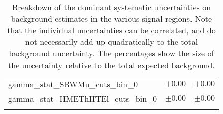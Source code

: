 \begin{table}
\begin{center}
\begin{tabular*}{\textwidth}{@{\extracolsep{\fill}}lcc}
gamma\_stat\_SRWMu\_cuts\_bin\_0         & $\pm 0.00$          & $\pm 0.00$       \\
gamma\_stat\_HMEThHTEl\_cuts\_bin\_0         & $\pm 0.00$          & $\pm 0.00$       \\
\noalign{\smallskip}\hline\noalign{\smallskip}
\end{tabular*}
\end{center}
\caption[Breakdown of uncertainty on background estimates]{
Breakdown of the dominant systematic uncertainties on background estimates in the various signal regions.
Note that the individual uncertainties can be correlated, and do not necessarily add up quadratically to 
the total background uncertainty. The percentages show the size of the uncertainty relative to the total expected background.
\label{table.results.bkgestimate.uncertainties.HMThHTEl_HMThHTMu}}
\end{table}
%